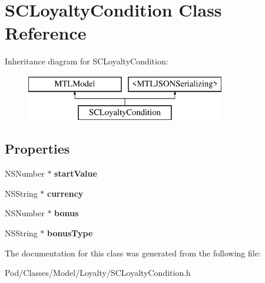 \hypertarget{interface_s_c_loyalty_condition}{}\section{S\+C\+Loyalty\+Condition Class Reference}
\label{interface_s_c_loyalty_condition}
Inheritance diagram for S\+C\+Loyalty\+Condition\+:\begin{figure}[H]
\begin{center}
\leavevmode
\includegraphics[height=2.000000cm]{interface_s_c_loyalty_condition}
\end{center}
\end{figure}
\subsection*{Properties}
\begin{DoxyCompactItemize}
\item 
N\+S\+Number $\ast$ {\bfseries start\+Value}\hypertarget{interface_s_c_loyalty_condition_a7aa82232ffc7906b147ea1d90c6f0340}{}\label{interface_s_c_loyalty_condition_a7aa82232ffc7906b147ea1d90c6f0340}

\item 
N\+S\+String $\ast$ {\bfseries currency}\hypertarget{interface_s_c_loyalty_condition_ab56935cb2b491adc799e91d680b94d14}{}\label{interface_s_c_loyalty_condition_ab56935cb2b491adc799e91d680b94d14}

\item 
N\+S\+Number $\ast$ {\bfseries bonus}\hypertarget{interface_s_c_loyalty_condition_a495191d78ac44e7989dce6f124ba8f94}{}\label{interface_s_c_loyalty_condition_a495191d78ac44e7989dce6f124ba8f94}

\item 
N\+S\+String $\ast$ {\bfseries bonus\+Type}\hypertarget{interface_s_c_loyalty_condition_aca49054f5f372e245ee27704c4cea30b}{}\label{interface_s_c_loyalty_condition_aca49054f5f372e245ee27704c4cea30b}

\end{DoxyCompactItemize}


The documentation for this class was generated from the following file\+:\begin{DoxyCompactItemize}
\item 
Pod/\+Classes/\+Model/\+Loyalty/S\+C\+Loyalty\+Condition.\+h\end{DoxyCompactItemize}
